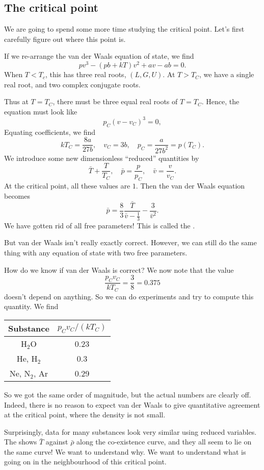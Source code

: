 \documentclass[a4paper]{article}
\begin{document}
\subsection{The critical point}
We are going to spend some more time studying the critical point. Let's first carefully figure out where this point is.

If we re-arrange the van der Waals equation of state, we find
\[
  pv^3 - (pb + kT) v^2 + av - ab = 0.\tag{$*$}
\]
When $T < T_c$, this has three real roots, $(L, G, U)$. At $T > T_C$, we have a single real root, and two complex conjugate roots.

Thus at $T = T_C$, there must be three equal real roots of $T = T_C$. Hence, the equation must look like
\[
  p_C(v - v_C)^3 = 0,
\]
Equating coefficients, we find
\[
  k T_C = \frac{8a}{27 b},\quad v_C = 3b,\quad p_C = \frac{a}{27 b^2} = p(T_C).
\]
We introduce some new dimensionless ``reduced'' quantities by
\[
  \bar{T} + \frac{T}{T_C},\quad \bar{p} = \frac{p}{p_C},\quad \bar{v} = \frac{v}{v_C}.
\]
At the critical point, all these values are $1$. Then the van der Waals equation becomes
\[
  \bar{p} = \frac{8}{3} \frac{\bar{T}}{\bar{v} - \frac{1}{3}} - \frac{3}{\bar{v}^2}.
\]
We have gotten rid of all free parameters! This is called the .

But van der Waals isn't really exactly correct. However, we can still do the same thing with any equation of state with two free parameters.

How do we know if van der Waals is correct? We now note that the value
\[
  \frac{p_C v_C}{k T_C} = \frac{3}{8} = 0.375
\]
doesn't depend on anything. So we can do experiments and try to compute this quantity. We find
\begin{center}
  \begin{tabular}{cc}
    \toprule
    Substance & $p_C v_C/(kT_C)$\\
    \midrule
    H$_2$O & 0.23\\
    He, H$_2$ & 0.3\\
    Ne, N$_2$, Ar & 0.29\\
    \bottomrule
  \end{tabular}
\end{center}
So we got the same order of magnitude, but the actual numbers are clearly off. Indeed, there is no reason to expect van der Waals to give quantitative agreement at the critical point, where the density is not small.

Surprisingly, data for many substances look very similar using reduced variables. The  shows $\bar{T}$ against $\bar{\rho}$ along the co-existence curve, and they all seem to lie on the same curve! We want to understand why. We want to understand what is going on in the neighbourhood of this critical point.
\end{document}
